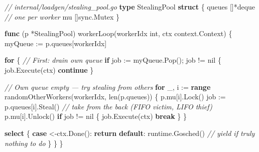 \documentclass[
]{article}
\newenvironment{Shaded}{}{}
\newcommand{\BuiltInTok}[1]{\textcolor[rgb]{0.00,0.50,0.00}{#1}}
\newcommand{\CommentTok}[1]{\textcolor[rgb]{0.38,0.63,0.69}{\textit{#1}}}
\newcommand{\ControlFlowTok}[1]{\textcolor[rgb]{0.00,0.44,0.13}{\textbf{#1}}}
\newcommand{\DataTypeTok}[1]{\textcolor[rgb]{0.56,0.13,0.00}{#1}}
\newcommand{\KeywordTok}[1]{\textcolor[rgb]{0.00,0.44,0.13}{\textbf{#1}}}
\newcommand{\NormalTok}[1]{#1}
\newcommand{\OperatorTok}[1]{\textcolor[rgb]{0.40,0.40,0.40}{#1}}
\newcommand{\OtherTok}[1]{\textcolor[rgb]{0.00,0.44,0.13}{#1}}
\begin{document}
\begin{Shaded}
\begin{Highlighting}[]
\CommentTok{// internal/loadgen/stealing\_pool.go}
\KeywordTok{type}\NormalTok{ StealingPool }\KeywordTok{struct} \OperatorTok{\{}
\NormalTok{    queues }\OperatorTok{[]*}\NormalTok{deque }\CommentTok{// one per worker}
\NormalTok{    mu     }\OperatorTok{[]}\NormalTok{sync}\OperatorTok{.}\NormalTok{Mutex}
\OperatorTok{\}}

\KeywordTok{func} \OperatorTok{(}\NormalTok{p }\OperatorTok{*}\NormalTok{StealingPool}\OperatorTok{)}\NormalTok{ workerLoop}\OperatorTok{(}\NormalTok{workerIdx }\DataTypeTok{int}\OperatorTok{,}\NormalTok{ ctx context}\OperatorTok{.}\NormalTok{Context}\OperatorTok{)} \OperatorTok{\{}
\NormalTok{    myQueue }\OperatorTok{:=}\NormalTok{ p}\OperatorTok{.}\NormalTok{queues}\OperatorTok{[}\NormalTok{workerIdx}\OperatorTok{]}

    \ControlFlowTok{for} \OperatorTok{\{}
        \CommentTok{// First: drain own queue}
        \ControlFlowTok{if}\NormalTok{ job }\OperatorTok{:=}\NormalTok{ myQueue}\OperatorTok{.}\NormalTok{Pop}\OperatorTok{();}\NormalTok{ job }\OperatorTok{!=} \OtherTok{nil} \OperatorTok{\{}
\NormalTok{            job}\OperatorTok{.}\NormalTok{Execute}\OperatorTok{(}\NormalTok{ctx}\OperatorTok{)}
            \ControlFlowTok{continue}
        \OperatorTok{\}}

        \CommentTok{// Own queue empty — try stealing from others}
        \ControlFlowTok{for}\NormalTok{ \_}\OperatorTok{,}\NormalTok{ i }\OperatorTok{:=} \KeywordTok{range}\NormalTok{ randomOtherWorkers}\OperatorTok{(}\NormalTok{workerIdx}\OperatorTok{,} \BuiltInTok{len}\OperatorTok{(}\NormalTok{p}\OperatorTok{.}\NormalTok{queues}\OperatorTok{))} \OperatorTok{\{}
\NormalTok{            p}\OperatorTok{.}\NormalTok{mu}\OperatorTok{[}\NormalTok{i}\OperatorTok{].}\NormalTok{Lock}\OperatorTok{()}
\NormalTok{            job }\OperatorTok{:=}\NormalTok{ p}\OperatorTok{.}\NormalTok{queues}\OperatorTok{[}\NormalTok{i}\OperatorTok{].}\NormalTok{Steal}\OperatorTok{()} \CommentTok{// take from the back (FIFO victim, LIFO thief)}
\NormalTok{            p}\OperatorTok{.}\NormalTok{mu}\OperatorTok{[}\NormalTok{i}\OperatorTok{].}\NormalTok{Unlock}\OperatorTok{()}
            \ControlFlowTok{if}\NormalTok{ job }\OperatorTok{!=} \OtherTok{nil} \OperatorTok{\{}
\NormalTok{                job}\OperatorTok{.}\NormalTok{Execute}\OperatorTok{(}\NormalTok{ctx}\OperatorTok{)}
                \ControlFlowTok{break}
            \OperatorTok{\}}
        \OperatorTok{\}}

        \ControlFlowTok{select} \OperatorTok{\{}
        \ControlFlowTok{case} \OperatorTok{\textless{}{-}}\NormalTok{ctx}\OperatorTok{.}\NormalTok{Done}\OperatorTok{():}
            \ControlFlowTok{return}
        \ControlFlowTok{default}\OperatorTok{:}
\NormalTok{            runtime}\OperatorTok{.}\NormalTok{Gosched}\OperatorTok{()} \CommentTok{// yield if truly nothing to do}
        \OperatorTok{\}}
    \OperatorTok{\}}
\OperatorTok{\}}
\end{Highlighting}
\end{Shaded}
\end{document}
